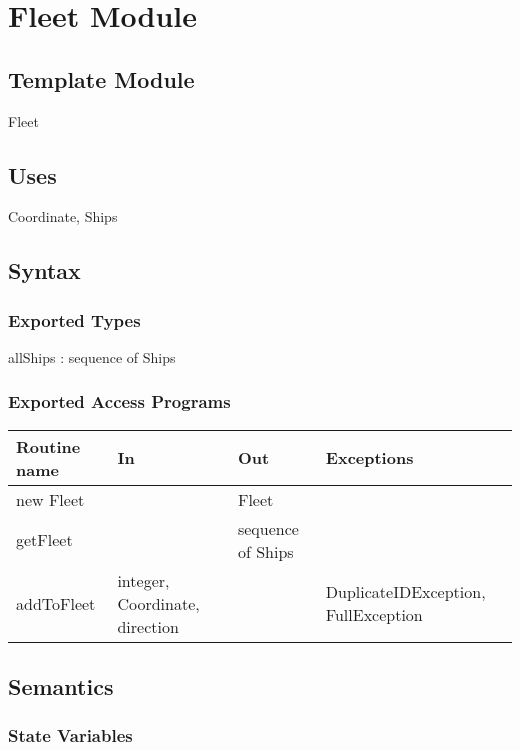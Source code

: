 \documentclass[12pt,fleqn]{article}
\begin{document}
\newpage

\section* {Fleet Module}

    \subsection* {Template Module}

    Fleet

    \subsection* {Uses}

    Coordinate, Ships

    \subsection* {Syntax}

    \subsubsection* {Exported Types}

    allShips : sequence of Ships

    \subsubsection* {Exported Access Programs}

    \begin{tabularx}{\linewidth}{|X|X|X|X|}
    \hline
    \textbf{Routine name} & \textbf{In} & \textbf{Out} & \textbf{Exceptions}\\
    \hline
    new Fleet & ~ & Fleet & ~\\
    \hline
    getFleet & ~ & sequence of Ships & ~\\
    \hline
    addToFleet & integer, Coordinate, direction & ~ & DuplicateIDException, FullException\\
    \hline

    \end{tabularx}

    \subsection* {Semantics}

    \subsubsection* {State Variables}
\end{document}

